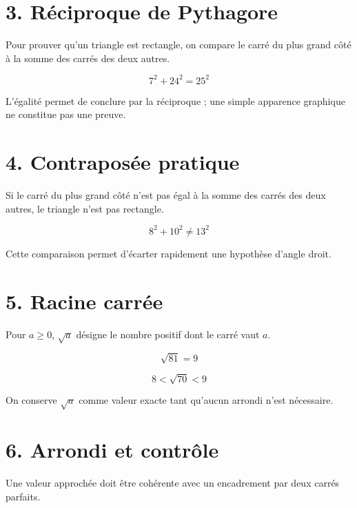 
\section{3. Réciproque de Pythagore}
Pour prouver qu’un triangle est rectangle, on compare le carré du plus grand côté à la somme des carrés des deux autres.

\[
7^2+24^2=25^2
\]

\begin{exemple}
L’égalité permet de conclure par la réciproque ; une simple apparence graphique ne constitue pas une preuve.
\end{exemple}

\section{4. Contraposée pratique}
Si le carré du plus grand côté n’est pas égal à la somme des carrés des deux autres, le triangle n’est pas rectangle.

\[
8^2+10^2\neq13^2
\]

\begin{exemple}
Cette comparaison permet d’écarter rapidement une hypothèse d’angle droit.
\end{exemple}

\section{5. Racine carrée}
Pour $a\ge0$, $\sqrt a$ désigne le nombre positif dont le carré vaut $a$.

\[
\sqrt{81}=9
\]

\[
8<\sqrt{70}<9
\]

\begin{exemple}
On conserve $\sqrt a$ comme valeur exacte tant qu’aucun arrondi n’est nécessaire.
\end{exemple}


\section{6. Arrondi et contrôle}
Une valeur approchée doit être cohérente avec un encadrement par deux carrés parfaits.


